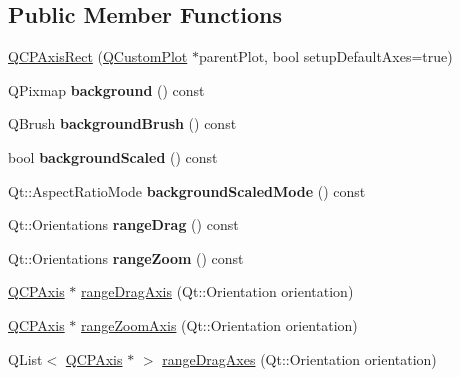 \subsection*{Public Member Functions}
\begin{DoxyCompactItemize}
\item 
\hyperlink{class_q_c_p_axis_rect_a60b31dece805462c1b82eea2e69ba042}{Q\+C\+P\+Axis\+Rect} (\hyperlink{class_q_custom_plot}{Q\+Custom\+Plot} $\ast$parent\+Plot, bool setup\+Default\+Axes=true)
\item 
\mbox{\label{class_q_c_p_axis_rect_a572deec9c9a4d5987d5c5f78521991e6}} 
Q\+Pixmap {\bfseries background} () const
\item 
\mbox{\label{class_q_c_p_axis_rect_a7d09540e3fef12362d00e6bac92b6453}} 
Q\+Brush {\bfseries background\+Brush} () const
\item 
\mbox{\label{class_q_c_p_axis_rect_a059ede9a5fdcafb5cef280cd65fe4f3a}} 
bool {\bfseries background\+Scaled} () const
\item 
\mbox{\label{class_q_c_p_axis_rect_a06b98faf54b5491bff780294e423d3ff}} 
Qt\+::\+Aspect\+Ratio\+Mode {\bfseries background\+Scaled\+Mode} () const
\item 
\mbox{\label{class_q_c_p_axis_rect_aa3a84c768ad6edd08fd4c5dec176828f}} 
Qt\+::\+Orientations {\bfseries range\+Drag} () const
\item 
\mbox{\label{class_q_c_p_axis_rect_aa0d8414ef040523f8b2d55f0c0bddbee}} 
Qt\+::\+Orientations {\bfseries range\+Zoom} () const
\item 
\hyperlink{class_q_c_p_axis}{Q\+C\+P\+Axis} $\ast$ \hyperlink{class_q_c_p_axis_rect_a6d7c22cfc54fac7a3d6ef80b133a8574}{range\+Drag\+Axis} (Qt\+::\+Orientation orientation)
\item 
\hyperlink{class_q_c_p_axis}{Q\+C\+P\+Axis} $\ast$ \hyperlink{class_q_c_p_axis_rect_a679c63f2b8daccfe6ec5110dce3dd3b6}{range\+Zoom\+Axis} (Qt\+::\+Orientation orientation)
\item 
Q\+List$<$ \hyperlink{class_q_c_p_axis}{Q\+C\+P\+Axis} $\ast$ $>$ \hyperlink{class_q_c_p_axis_rect_aae5f99a044ca911685a306f01b7ff941}{range\+Drag\+Axes} (Qt\+::\+Orientation orientation)

\end{DoxyCompactItemize}

